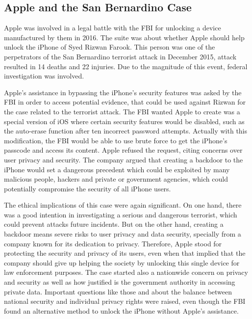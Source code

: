\subsection{Apple and the San Bernardino Case}\label{subsec:apple-and-the-san-bernardino-case}
Apple was involved in a legal battle with the FBI for unlocking a device manufactured by them in 2016\cite{Benner2016_AppleFightsOrder}.
The suite was about whether Apple should help unlock the iPhone of Syed Rizwan Farook.
This person was one of the perpetrators of the San Bernardino terrorist attack in December 2015, attack resulted in 14 deaths and 22 injuries.
Due to the magnitude of this event, federal investigation was involved.

Apple's assistance in bypassing the iPhone's security features was asked by the FBI in order to access potential evidence, that could be used against Rizwan for the case related to the terrorist attack.
The FBI wanted Apple to create was a special version of iOS where certain security features would be disabled, such as the auto-erase function after ten incorrect password attempts.
Actually with this modification, the FBI would be able to use brute force to get the iPhone's passcode and access its content.
Apple refused the request, citing concerns over user privacy and security.
The company argued that creating a backdoor to the iPhone would set a dangerous precedent which could be exploited by many malicious people, hackers and private or government agencies, which could potentially compromise the security of all iPhone users.

The ethical implications of this case were again significant.
On one hand, there was a good intention in investigating a serious and dangerous terrorist, which could prevent attacks future incidents.
But on the other hand, creating a backdoor means severe risks to user privacy and data security, specially from a company known for its dedication to privacy.
Therefore, Apple stood for protecting the security and privacy of its users, even when that implied that the company should give up helping the society by unlocking this single device for law enforcement purposes.
The case started also a nationwide concern on privacy and security as well as how justified is the government authority in accessing private data.
Important questions like those and about the balance between national security and individual privacy rights were raised, even though the FBI found an alternative method to unlock the iPhone without Apple's assistance.

